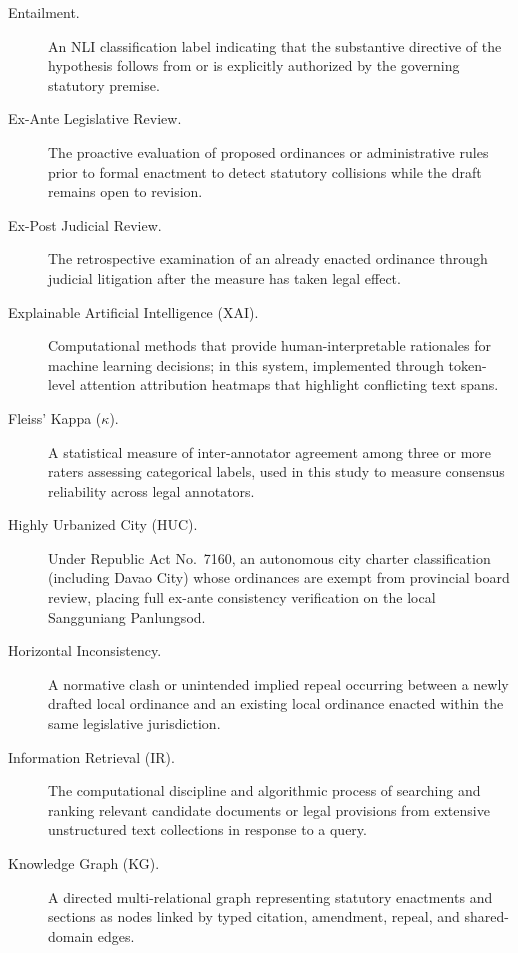 \begin{description}
    \item[Entailment.] An NLI classification label indicating that the substantive directive of the hypothesis follows from or is explicitly authorized by the governing statutory premise.

    \item[Ex-Ante Legislative Review.] The proactive evaluation of proposed ordinances or administrative rules prior to formal enactment to detect statutory collisions while the draft remains open to revision.

    \item[Ex-Post Judicial Review.] The retrospective examination of an already enacted ordinance through judicial litigation after the measure has taken legal effect.

    \item[Explainable Artificial Intelligence (XAI).] Computational methods that provide human-interpretable rationales for machine learning decisions; in this system, implemented through token-level attention attribution heatmaps that highlight conflicting text spans.

    \item[Fleiss' Kappa ($\kappa$).] A statistical measure of inter-annotator agreement among three or more raters assessing categorical labels, used in this study to measure consensus reliability across legal annotators.

    \item[Highly Urbanized City (HUC).] Under Republic Act No.~7160, an autonomous city charter classification (including Davao City) whose ordinances are exempt from provincial board review, placing full ex-ante consistency verification on the local Sangguniang Panlungsod.

    \item[Horizontal Inconsistency.] A normative clash or unintended implied repeal occurring between a newly drafted local ordinance and an existing local ordinance enacted within the same legislative jurisdiction.

    \item[Information Retrieval (IR).] The computational discipline and algorithmic process of searching and ranking relevant candidate documents or legal provisions from extensive unstructured text collections in response to a query.

    \item[Knowledge Graph (KG).] A directed multi-relational graph representing statutory enactments and sections as nodes linked by typed citation, amendment, repeal, and shared-domain edges.


\end{description}
